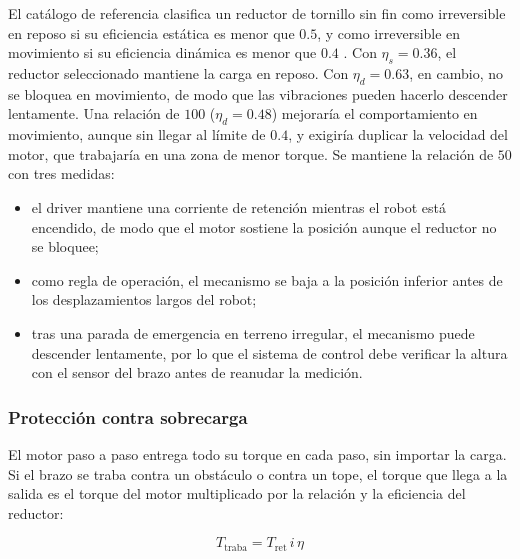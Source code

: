 \documentclass[../../General.tex]{subfiles}
\begin{document}
El catálogo de referencia clasifica un reductor de tornillo sin fin como irreversible en reposo si su eficiencia estática es menor que $0.5$, y como irreversible en movimiento si su eficiencia dinámica es menor que $0.4$ \citep{motovario_vsf}. Con $\eta_s = 0.36$, el reductor seleccionado mantiene la carga en reposo. Con $\eta_d = 0.63$, en cambio, no se bloquea en movimiento, de modo que las vibraciones pueden hacerlo descender lentamente. Una relación de $100$ ($\eta_d = 0.48$) mejoraría el comportamiento en movimiento, aunque sin llegar al límite de $0.4$, y exigiría duplicar la velocidad del motor, que trabajaría en una zona de menor torque. Se mantiene la relación de $50$ con tres medidas:
\begin{itemize}
    \item el driver mantiene una corriente de retención mientras el robot está encendido, de modo que el motor sostiene la posición aunque el reductor no se bloquee;
    \item como regla de operación, el mecanismo se baja a la posición inferior antes de los desplazamientos largos del robot;
    \item tras una parada de emergencia en terreno irregular, el mecanismo puede descender lentamente, por lo que el sistema de control debe verificar la altura con el sensor del brazo antes de reanudar la medición.
\end{itemize}

\subsubsection{Protección contra sobrecarga}

El motor paso a paso entrega todo su torque en cada paso, sin importar la carga. Si el brazo se traba contra un obstáculo o contra un tope, el torque que llega a la salida es el torque del motor multiplicado por la relación y la eficiencia del reductor:

\begin{equation}\label{eq:Ttraba_elev}
    T_{\text{traba}} = T_{\text{ret}}\, i\, \eta
\end{equation}
\end{document}
